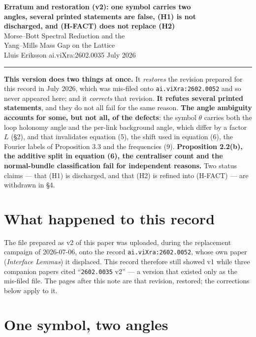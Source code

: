 \documentclass[11pt]{article}
\begin{document}
\begin{center}
{\Large\bfseries Erratum and restoration (v2): one symbol carries two\\
angles, several printed statements are false, (H1) is not\\
discharged, and (H-FACT) does not replace (H2)}\\[5pt]
{\large Morse--Bott Spectral Reduction and the\\
Yang--Mills Mass Gap on the Lattice}\\[6pt]
Lluis Eriksson \quad\textbullet\quad ai.viXra:2602.0035 \quad\textbullet\quad July 2026
\end{center}

\noindent\rule{\textwidth}{0.8pt}

\vspace{2pt}
\noindent
\textbf{This version does two things at once.} It \emph{restores} the revision prepared
for this record in July 2026, which was mis-filed onto \texttt{ai.viXra:2602.0052} and
so never appeared here; and it \emph{corrects} that revision. \textbf{It refutes several
printed statements}, and they do not all fail for the same reason. \textbf{The angle
ambiguity accounts for some, but not all, of the defects}: the symbol $\theta$ carries
both the loop holonomy angle and the per-link background angle, which differ by a factor
$L$ (\S2), and that invalidates equation (5), the shift used in equation (6), the Fourier
labels of Proposition 3.3 and the frequencies (9). \textbf{Proposition 2.2(b), the
additive split in equation (6), the centraliser count and the normal-bundle
classification fail for independent reasons.} Two status claims --- that (H1) is
discharged, and that (H2) is refined into (H-FACT) --- are withdrawn in \S4.

\section{What happened to this record}

The file prepared as v2 of this paper was uploaded, during the replacement campaign of
2026-07-06, onto the record \texttt{ai.viXra:2602.0052}, whose own paper
(\emph{Interface Lemmas}) it displaced. This record therefore still showed v1 while
three companion papers cited ``\texttt{2602.0035} v2'' --- a version that existed only
as the mis-filed file. The pages after this note are that revision, restored; the
corrections below apply to it.

\section{One symbol, two angles}
\end{document}
